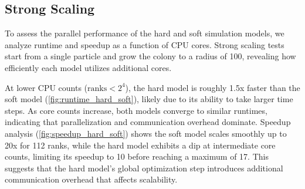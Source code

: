 \documentclass[conference]{IEEEtran}
\begin{document}
\subsection{Strong Scaling}

To assess the parallel performance of the hard and soft simulation models, we analyze runtime and speedup as a function of CPU cores. Strong scaling tests start from a single particle and grow the colony to a radius of 100, revealing how efficiently each model utilizes additional cores.

At lower CPU counts ($\text{ranks}< 2^4$), the hard model is roughly 1.5x faster than the soft model (\autoref{fig:runtime_hard_soft}), likely due to its ability to take larger time steps. As core counts increase, both models converge to similar runtimes, indicating that parallelization and communication overhead dominate. Speedup analysis (\autoref{fig:speedup_hard_soft}) shows the soft model scales smoothly up to 20x for 112 ranks, while the hard model exhibits a dip at intermediate core counts, limiting its speedup to 10 before reaching a maximum of 17. This suggests that the hard model's global optimization step introduces additional communication overhead that affects scalability.
\end{document}
